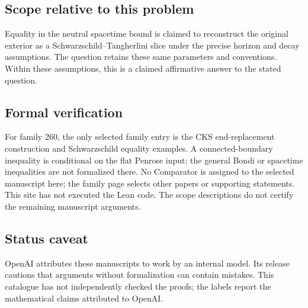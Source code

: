 \documentclass[11pt]{article}
\begin{document}
\subsection{Scope relative to this problem}
Equality in the neutral spacetime bound is claimed to reconstruct the original exterior as a Schwarzschild--Tangherlini slice under the precise horizon and decay assumptions. The question retains these same parameters and conventions. Within these assumptions, this is a claimed affirmative answer to the stated question.

\subsection{Formal verification}
For family 260, the only selected family entry is the CKS end-replacement construction and Schwarzschild equality examples. A connected-boundary inequality is conditional on the flat Penrose input; the general Bondi or spacetime inequalities are not formalized there. No Comparator is assigned to the selected manuscript here; the family page selects other papers or supporting statements. This site has not executed the Lean code. The scope descriptions do not certify the remaining manuscript arguments.

\subsection{Status caveat}
OpenAI attributes these manuscripts to work by an internal model. Its release cautions that arguments without formalization can contain mistakes. This catalogue has not independently checked the proofs; the labels report the mathematical claims attributed to OpenAI.
\end{document}
